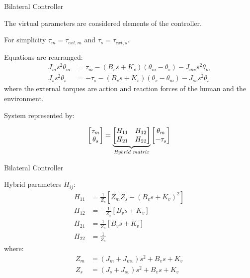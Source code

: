 \documentclass[10pt]{beamer}
\begin{document}
\begin{frame}[fragile]{Bilateral Controller}

The virtual parameters are considered elements of the controller.

For simplicity $ \tau_m = \tau_{ext,m} $ and $ \tau_s = \tau_{ext,s} $.

Equations are rearranged:
\begin{align*}
	J_m s^2 \theta_m &= \tau_m - (B_v s + K_v) (\theta_m - \theta_s) - J_{mv} s^2 \theta_m \\
	J_s s^2 \theta_s &= - \tau_s - (B_v s + K_v) (\theta_s - \theta_m) - J_{sv} s^2 \theta_s
\end{align*}
where the external torques are action and reaction forces of the human and the environment.

System represented by:

\begin{equation*}
\begin{bmatrix}
\tau_m \\ \theta_s
\end{bmatrix} = 
\underbrace{\begin{bmatrix}
H_{11} & H_{12} \\
H_{21} & H_{22}
\end{bmatrix}}_{\text{\textit{Hybrid matrix}}}
\begin{bmatrix}
\theta_m \\ - \tau_s
\end{bmatrix}
\label{hybrid_matrix}
\end{equation*}

\end{frame}

\begin{frame}[fragile]{Bilateral Controller}

Hybrid parameters $ H_{ij} $:
\begin{align*}
	H_{11} &= \frac{1}{Z_s}[Z_m Z_s - (B_v s + K_v)^2] \\
	H_{12} &= -\frac{1}{Z_s}[B_v s + K_v] \\
	H_{21} &= \frac{1}{Z_s}[B_v s + K_v] \\
	H_{22} &= \frac{1}{Z_s} 
\end{align*}
where:
\begin{align*}
	Z_m &= (J_m + J_{mv}) s^2 + B_v s + K_v \\
	Z_s &= (J_s + J_{sv}) s^2 + B_v s + K_v
\end{align*}

\end{frame}
\end{document}
